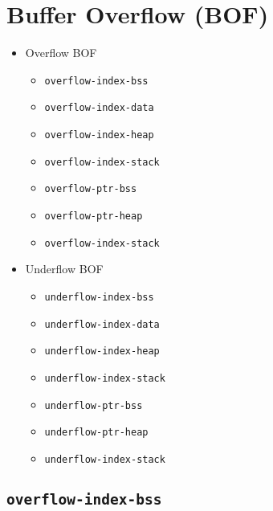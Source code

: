 \documentclass[a4paper]{book}
\begin{document}
\section{Buffer Overflow (BOF)}
\begin{itemize}[noitemsep]

\item Overflow BOF
 \begin{itemize}[noitemsep, nolistsep, leftmargin=1em]
    \item[\ref{test-overflow-index-bss}] 		\texttt{overflow-index-bss}
    \item[\ref{test-overflow-index-data}]       \texttt{overflow-index-data}
    \item[\ref{test-overflow-index-heap}]       \texttt{overflow-index-heap}
    \item[\ref{test-overflow-index-stack}] 	    \texttt{overflow-index-stack}
    \item[\ref{test-overflow-ptr-bss}] 			\texttt{overflow-ptr-bss}   
    \item[\ref{test-overflow-ptr-heap}] 		\texttt{overflow-ptr-heap}     
    \item[\ref{test-overflow-index-stack}] 		\texttt{overflow-index-stack}       
 \end{itemize}

\item Underflow BOF
 \begin{itemize}[noitemsep, nolistsep, leftmargin=1em]
    \item[\ref{test-underflow-index-bss}] 		\texttt{underflow-index-bss}
    \item[\ref{test-underflow-index-data}]      \texttt{underflow-index-data}
    \item[\ref{test-underflow-index-heap}]      \texttt{underflow-index-heap}
    \item[\ref{test-underflow-index-stack}] 	\texttt{underflow-index-stack}
    \item[\ref{test-underflow-ptr-bss}] 	    \texttt{underflow-ptr-bss}   
    \item[\ref{test-underflow-ptr-heap}] 		\texttt{underflow-ptr-heap}     
    \item[\ref{test-underflow-index-stack}]     \texttt{underflow-index-stack}       
 \end{itemize}

\end{itemize}

\newpage

\subsection{\texttt{overflow-index-bss}}\label{test-overflow-index-bss}
\end{document}
